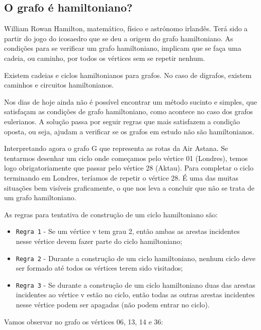 \subsection{ O grafo é hamiltoniano? }
William Rowan Hamilton, matemático, físico e astrónomo irlandês. Terá sido a partir do jogo do icosaedro
que se deu a origem do grafo hamiltoniano. As condições para se verificar um grafo hamiltoniano, implicam
que se faça uma cadeia, ou caminho, por todos os vértices sem se repetir nenhum.\par
Existem cadeias e ciclos hamiltonianos para grafos. No caso de digrafos, existem caminhos e circuitos 
hamiltonianos.\par
Nos dias de hoje ainda não é possível encontrar um método sucinto e simples, que satisfaçam as
condições de grafo hamiltoniano, como acontece no caso dos grafos eulerianos. A solução passa por seguir 
regras que mais satisfazem a condição oposta, ou seja, ajudam a verificar se os grafos em estudo não são 
hamiltonianos.\par
Interpretando agora o grafo G que representa as rotas da Air Astana. Se tentarmos desenhar um ciclo 
onde começamos pelo vértice 01 (Londres), temos logo obrigatoriamente que passar pelo vértice 28 (Aktau). 
Para completar o ciclo terminando em Londres, teríamos de repetir o vértice 28. É uma das muitas situações 
bem visíveis graficamente, o que nos leva a concluir que não se trata de um grafo hamiltoniano.\par
As regras para tentativa de construção de um ciclo hamiltoniano são:\par
\begin{itemize}
    \item \verb|Regra 1| - Se um vértice v tem grau 2, então ambas as arestas incidentes nesse vértice devem fazer parte 
    do ciclo hamiltoniano;\\
    \item  \verb|Regra 2| -  Durante a construção de um ciclo hamiltoniano, nenhum ciclo deve ser formado até todos os 
    vértices terem sido visitados;\\
    \item \verb|Regra 3| - Se durante a construção de um ciclo hamiltoniano duas das arestas incidentes ao vértice v estão 
    no ciclo, então todas as outras arestas incidentes nesse vértice podem ser apagadas (não podem entrar no 
    ciclo).\\
\end{itemize}
Vamos observar no grafo os vértices 06, 13, 14 e 36:\par
